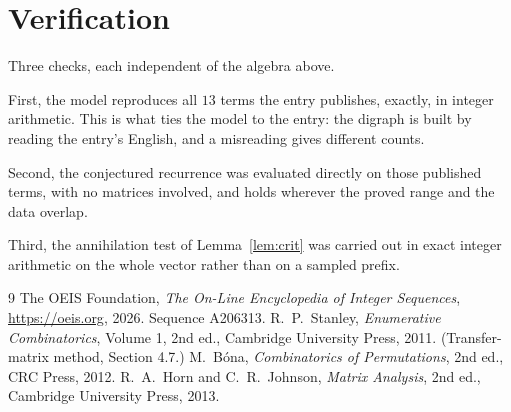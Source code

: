 \documentclass[11pt,a4paper]{article}
\theoremstyle{plain}
\theoremstyle{definition}
\begin{document}
\section{Verification}

Three checks, each independent of the algebra above.

First, the model reproduces all $13$ terms the entry publishes, exactly, in integer
arithmetic. This is what ties the model to the entry: the digraph is built by reading the
entry's English, and a misreading gives different counts.

Second, the conjectured recurrence was evaluated directly on those published terms, with no
matrices involved, and holds wherever the proved range and the data overlap.

Third, the annihilation test of Lemma~\ref{lem:crit} was carried out in exact integer
arithmetic on the whole vector rather than on a sampled prefix.

\begin{thebibliography}{9}
 The OEIS Foundation, \emph{The On-Line Encyclopedia of Integer
Sequences}, \url{https://oeis.org}, 2026. Sequence A206313.
 R.~P.~Stanley, \emph{Enumerative Combinatorics}, Volume 1, 2nd ed.,
Cambridge University Press, 2011. (Transfer-matrix method, Section 4.7.)
 M.~B\'ona, \emph{Combinatorics of Permutations}, 2nd ed., CRC
Press, 2012.
 R.~A.~Horn and C.~R.~Johnson, \emph{Matrix Analysis}, 2nd ed., Cambridge
University Press, 2013.
\end{thebibliography}
\end{document}
